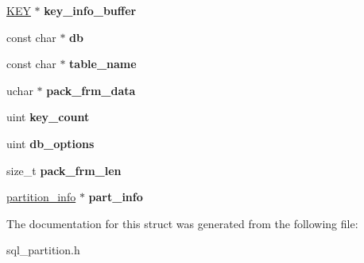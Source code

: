 \begin{DoxyCompactItemize}
\mbox{\hyperlink{structst__key}{K\+EY}} $\ast$ {\bfseries key\+\_\+info\+\_\+buffer}
\item 
\mbox{\label{structst__lock__param__type_a31d87fdcb06666fdb633a37954a54849}} 
const char $\ast$ {\bfseries db}
\item 
\mbox{\label{structst__lock__param__type_ab57314467f02dcc5fdec42bbb1229d4e}} 
const char $\ast$ {\bfseries table\+\_\+name}
\item 
\mbox{\label{structst__lock__param__type_a0066b329ac217f5271601f4e5e0c9905}} 
uchar $\ast$ {\bfseries pack\+\_\+frm\+\_\+data}
\item 
\mbox{\label{structst__lock__param__type_a3496c36d98ad81077f84281449bec670}} 
uint {\bfseries key\+\_\+count}
\item 
\mbox{\label{structst__lock__param__type_aa86d0fda39a31ca0f55fd7ceb18f4c24}} 
uint {\bfseries db\+\_\+options}
\item 
\mbox{\label{structst__lock__param__type_a41ddaab4f683c3971e4d2955457fffb2}} 
size\+\_\+t {\bfseries pack\+\_\+frm\+\_\+len}
\item 
\mbox{\label{structst__lock__param__type_aa76c86d9bf8c32973e17f8bcd50947a7}} 
\mbox{\hyperlink{classpartition__info}{partition\+\_\+info}} $\ast$ {\bfseries part\+\_\+info}
\end{DoxyCompactItemize}


The documentation for this struct was generated from the following file\+:\begin{DoxyCompactItemize}
\item 
sql\+\_\+partition.\+h\end{DoxyCompactItemize}
